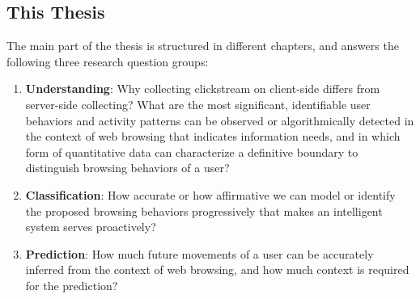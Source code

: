 \subsection{This Thesis}



The main part of the thesis is structured in different chapters, and answers the following
three research question groups:

\begin{enumerate}
    \item \textbf{Understanding}: Why collecting clickstream on client-side differs 
        from server-side collecting?
        What are the most significant, identifiable user behaviors and activity patterns 
        can be observed or algorithmically detected in the context of web browsing that 
        indicates information needs,
        and in which form of quantitative data can characterize a definitive boundary to 
        distinguish browsing behaviors of a user?
    \item \textbf{Classification}: How accurate or how affirmative we can model or identify 
        the proposed browsing behaviors progressively that makes an intelligent system 
        serves proactively?
    \item \textbf{Prediction}: How much future movements of a user can be accurately inferred 
        from the context of web browsing, and how much context is required for the prediction?

\end{enumerate}

